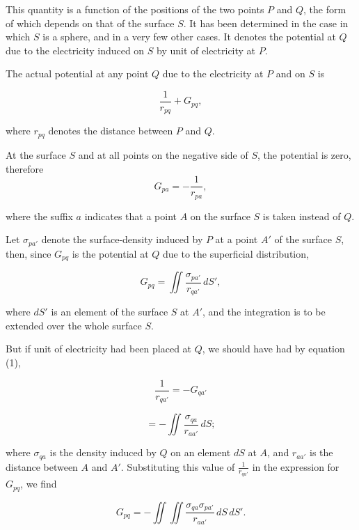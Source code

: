 \documentclass[11pt,a4paper]{article}
\begin{document}
This quantity is a function of the positions of the two points $P$ and $Q$, the form of which depends on that of the surface $S$. It has been determined in the case in which $S$ is a sphere, and in a very few other cases. It denotes the potential at $Q$ due to the electricity induced on $S$ by unit of electricity at $P$.

The actual potential at any point $Q$ due to the electricity at $P$ and on $S$ is

\[
\frac{1}{r_{pq}}+G_{pq},
\]

where $r_{pq}$ denotes the distance between $P$ and $Q$.

At the surface $S$ and at all points on the negative side of $S$, the potential is zero, therefore
\begin{equation}\tag{1}
G_{pa}=-\frac{1}{r_{pa}},
\end{equation}

where the suffix $a$ indicates that a point $A$ on the surface $S$ is taken instead of $Q$.

Let $\sigma_{pa'}$ denote the surface-density induced by $P$ at a point $A'$ of the surface $S$, then, since $G_{pq}$ is the potential at $Q$ due to the superficial distribution,

\begin{equation}\tag{2}
G_{pq}=\iint \frac{\sigma_{pa'}}{r_{qa'}}\,dS',
\end{equation}

where $dS'$ is an element of the surface $S$ at $A'$, and the integration is to be extended over the whole surface $S$.

But if unit of electricity had been placed at $Q$, we should have had by equation (1),

\begin{equation}\tag{3}
\frac{1}{r_{qa'}}=-G_{qa'}
\end{equation}

\begin{equation}\tag{4}
=-\iint \frac{\sigma_{qa}}{r_{aa'}}\,dS;
\end{equation}

where $\sigma_{qa}$ is the density induced by $Q$ on an element $dS$ at $A$, and $r_{aa'}$ is the distance between $A$ and $A'$. Substituting this value of $\frac{1}{r_{qa'}}$ in the expression for $G_{pq}$, we find

\begin{equation}\tag{5}
G_{pq}=-\iint\!\!\iint
\frac{\sigma_{qa}\sigma_{pa'}}{r_{aa'}}\,dS\,dS'.
\end{equation}
\end{document}
